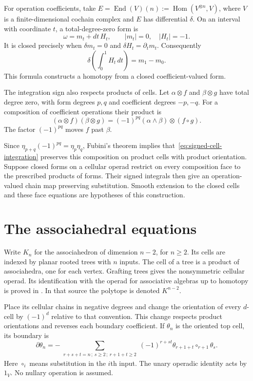 For operation coefficients, take
$E=\operatorname{End}(V)(n):=\operatorname{Hom}(V^{\otimes n},V)$,
where $V$ is a finite-dimensional cochain complex and $E$ has differential
$\delta$.
On an interval with coordinate $t$, a total-degree-zero form is
\[
 \omega=m_t+dt\,H_t,
 \qquad |m_t|=0,\quad |H_t|=-1.
\]
It is closed precisely when
$\delta m_t=0$ and $\delta H_t=\partial_t m_t$.
Consequently
\[
 \delta\left(\int_0^1 H_t\,dt\right)=m_1-m_0.
\]
This formula constructs a homotopy from a closed coefficient-valued form.

The integration sign also respects products of cells.
Let $\alpha\otimes f$ and $\beta\otimes g$ have total degree zero,
with form degrees $p,q$ and coefficient degrees $-p,-q$.
For a composition of coefficient operations their product is
\[
 (\alpha\otimes f)(\beta\otimes g)
       =(-1)^{pq}(\alpha\wedge\beta)\otimes(f\circ g).
\]
The factor $(-1)^{pq}$ moves $f$ past $\beta$.

Since $\eta_{p+q}(-1)^{pq}=\eta_p\eta_q$, Fubini's theorem implies
that~\eqref{eq:signed-cell-integration} preserves this composition
on product cells with product orientation.
Suppose closed forms on a cellular operad restrict on every composition
face to the prescribed products of forms.
Their signed integrals then give an operation-valued chain map
preserving substitution.
Smooth extension to the closed cells and these face equations
are hypotheses of this construction.

\section{The associahedral equations}
Write $K_n$ for the associahedron of dimension $n-2$, for $n\ge2$.
Its cells are indexed by planar rooted trees with $n$ inputs.
The cell of a tree is a product of associahedra, one for each vertex.
Grafting trees gives the nonsymmetric cellular operad.
Its identification with the operad for associative algebras up to homotopy
is proved in \cite[\S9.2, Proposition~9.2.8]{LV}.
In that source the polytope is denoted $K^{n-2}$.

Place its cellular chains in negative degrees and change the orientation
of every $d$-cell by $(-1)^d$ relative to that convention.
This change respects product orientations and reverses each boundary
coefficient.
If $\theta_n$ is the oriented top cell, its boundary is
\begin{equation}\label{eq:associahedral-boundary}
 \partial\theta_n=
 -\sum_{\substack{r+s+t=n\,;\ s\ge2\,;\ r+1+t\ge2}}
 (-1)^{r+st}\theta_{r+1+t}\circ_{r+1}\theta_s.
\end{equation}
Here $\circ_i$ means substitution in the $i$th input.
The unary operadic identity acts by $1_V$.
No nullary operation is assumed.

